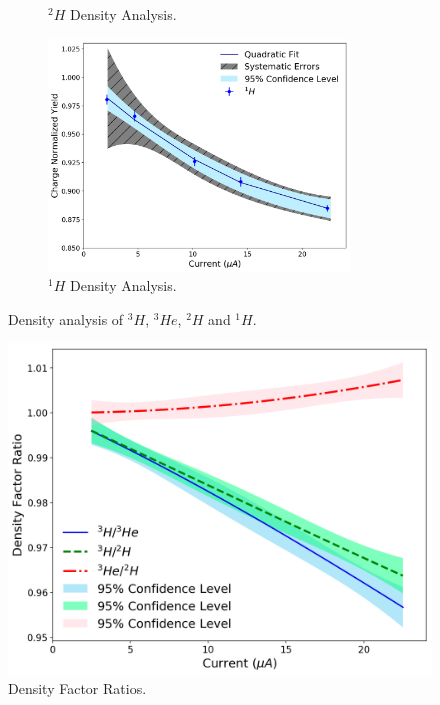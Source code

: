 \documentclass[final,5p,times,twocolumn]{elsarticle}
\begin{document}
\begin{figure}[h]
\begin{center}
\begin{subfigure}{8cm}
    \caption{$^{2}H$ Density Analysis.}
    \label{fig:deuterium_data}
  \end{subfigure}
  \begin{subfigure}{8cm}
    \centering\includegraphics[width=8cm]{images/hydrogen_data.pdf}
    \caption{$^{1}H$ Density Analysis.}
    \label{fig:hydrogen_data}
  \end{subfigure}
  \end{center}
  \label{fig:tritium_targets}
  \caption{Density analysis of $^{3}H$, $^{3}He$, $^{2}H$ and $^{1}H$.}
\end{figure}




%


\begin{figure}[!h]
 \centering
 \includegraphics[width=\linewidth]{images/density_factor_ratios.pdf}
  \caption{Density Factor Ratios. }
  \label{fig:density_ratios}
\end{figure}
\end{document}
